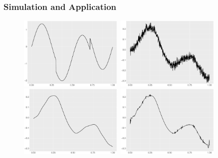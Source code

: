 \documentclass{beamer}
\begin{document}
\begin{frame}
\frametitle{Simulation and Application}
\begin{figure}
\centering
\includegraphics[width=5cm,height=3.5cm]{../Chapters/02TractorSplineTheory/plot/ggplot/ggHeaviSine.pdf}
\includegraphics[width=5cm,height=3.5cm]{../Chapters/02TractorSplineTheory/plot/ggplot/ggHeaviSinePositionNoise}\\
\includegraphics[width=5cm,height=3.5cm]{../Chapters/02TractorSplineTheory/plot/ggplot/ggHeaviSinePSpline}
\includegraphics[width=5cm,height=3.5cm]{../Chapters/02TractorSplineTheory/plot/ggplot/ggHeaviSineSure}
\end{figure}
\end{frame}
\end{document}
